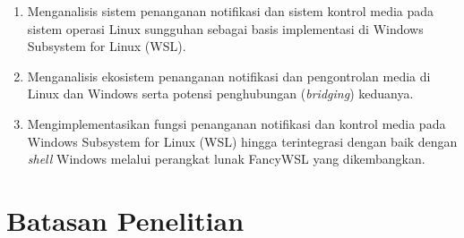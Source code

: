 \begin{enumerate}
    \item Menganalisis sistem penanganan notifikasi dan sistem kontrol media pada sistem operasi Linux sungguhan sebagai basis implementasi di Windows Subsystem for Linux (WSL).

    \item Menganalisis ekosistem penanganan notifikasi dan pengontrolan media di Linux dan Windows serta potensi penghubungan (\textit{bridging}) keduanya.

    \item Mengimplementasikan fungsi penanganan notifikasi dan kontrol media pada Windows Subsystem for Linux (WSL) hingga terintegrasi dengan baik dengan \textit{shell} Windows melalui perangkat lunak FancyWSL yang dikembangkan.
\end{enumerate}


\section{Batasan Penelitian}

